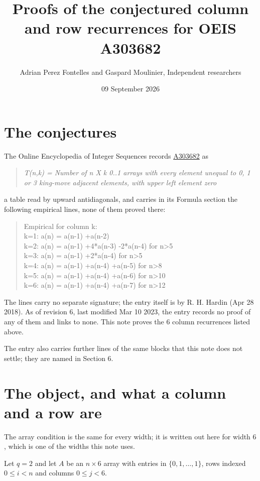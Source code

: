 \documentclass[11pt]{article}
\title{Proofs of the conjectured column and row recurrences for OEIS A303682}
\author{Adrian Perez Fontelles and Gaspard Moulinier, Independent researchers}
\date{09 September 2026}
\theoremstyle{definition}
\begin{document}
\maketitle
\section{The conjectures}

The Online Encyclopedia of Integer Sequences records \href{https://oeis.org/A303682}{A303682} as

\begin{quote}\itshape T(n,k) = Number of n X k 0..1 arrays with every element unequal to 0, 1 or 3 king-move adjacent elements, with upper left element zero\end{quote}

a table read by upward antidiagonals, and carries in its Formula section the following empirical lines, none of them proved there:

\begin{quote}\ttfamily Empirical for column k:\\
k=1: a(n) = a(n-1) +a(n-2)\\k=2: a(n) = a(n-1) +4*a(n-3) -2*a(n-4) for n>5\\k=3: a(n) = a(n-1) +2*a(n-4) for n>5\\k=4: a(n) = a(n-1) +a(n-4) +a(n-5) for n>8\\k=5: a(n) = a(n-1) +a(n-4) +a(n-6) for n>10\\k=6: a(n) = a(n-1) +a(n-4) +a(n-7) for n>12\end{quote}

The lines carry no separate signature; the entry itself is by R. H. Hardin (Apr 28 2018). As of revision 6, last modified Mar 10 2023, the entry records no proof of any of them and links to none. This note proves the 6 column recurrences listed above.

The entry also carries further lines of the same blocks that this note does not settle; they are named in Section 6.

\section{The object, and what a column and a row are}

The array condition is the same for every width; it is written out here for width $6$, which is one of the widths this note uses.

Let $q = 2$ and let $A$ be an $n \times 6$ array with entries in $\{0,1,\dots,1\}$, rows indexed $0 \le i < n$ and columns $0 \le j < 6$.
\end{document}
